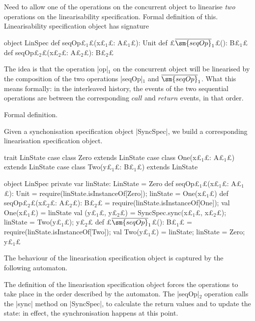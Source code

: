 \documentclass[12pt,a4paper]{article}
\def\s#1{$_{#1}$}
\begin{document}
Need to allow one of the operations on the concurrent object to linearise
\emph{two} operations on the linearisability specification.  Formal definition
of this.  Linearisability specification object has signature
%
\begin{scala}
object LinSpec{
  def seqOp£\s1£(x£\s1£: A£\s1£): Unit
  def £$\overline{\sm{seqOp}}_1$£(): B£\s1£
  def seqOp£\s2£(x£\s2£: A£\s2£): B£\s2£
}
\end{scala}
%
The idea is that the operation |op|\s1 on the concurrent object will be
linearised by the composition of the two operations |seqOp|\s1 and
$\overline{\sm{seqOp}}_1$.  What this means formally: in the interleaved
history, the events of the two sequential operations are between the
corresponding $call$ and $return$ events, in that order. 

Formal definition. 

Given a synchonisation specification object |SyncSpec|, we build a corresponding linearisation specification object.
\begin{scala}
trait LinState
case class Zero extends LinState
case class One(x£\s1£: A£\s1£) extends LinState
case class Two(y£\s1£: B£\s1£) extends LinState

object LinSpec{
  private var linState: LinState = Zero
  def seqOp£\s1£(x£\s1£: A£\s1£): Unit = {
    require(linState.isInstanceOf[Zero]); linState = One(x£\s1£)
  }
  def seqOp£\s2£(x£\s2£: A£\s2£): B£\s2£ = {
    require(linState.isInstanceOf[One]); val One(x£\s1£) = linState
    val (y£\s1£, y£\s2£) = SyncSpec.sync(x£\s1£, x£\s2£); linState = Two(y£\s1£); y£\s2£
  }
  def £$\overline{\sm{seqOp}}_1$£(): B£\s1£ = {
    require(linState.isInstanceOf[Two]); val Two(y£\s1£) = linState; linState = Zero; y£\s1£
  }
}
\end{scala}
%
The behaviour of the linearisation specification object is captured by the
following automaton.
%
\begin{center}
\end{center}
%
The definition of the linearisation specification object forces the operations
to take place in the order described by the automaton.  The |seqOp|\s2
operation calls the |sync| method on |SyncSpec|, to calculate the return
values and to update the state: in effect, the synchronisation happens at this
point. 
\end{document}
